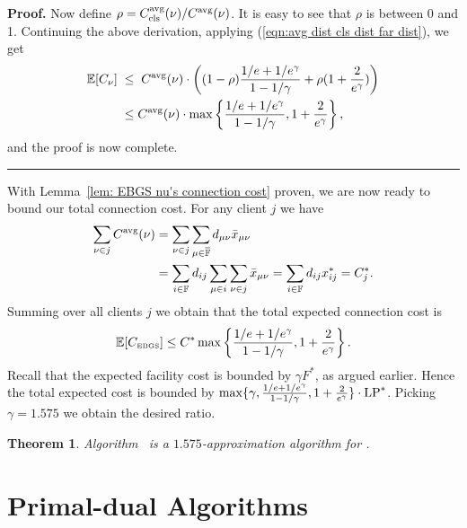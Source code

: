 \documentclass[oneside,final]{ucr}
\newtheorem{theorem}{Theorem}
\newenvironment{proof}[1][Proof]{\textbf{#1.} }{\ \rule{0.5em}{0.5em}}
\begin{document}
\begin{proof}
Now define $\rho =C_{{\mbox{\scriptsize\rm cls}}}^{{\mbox{\scriptsize\rm avg}}}(\nu)/C^{{\mbox{\scriptsize\rm avg}}}(\nu)$. It is easy to
see that $\rho$ is between 0 and 1. Continuing the above
derivation, applying (\ref{eqn:avg dist cls dist far dist}), we get
%
\begin{align*}
\mathbb{E}[C_{\nu}]
             \;&\le\; C^{{\mbox{\scriptsize\rm avg}}}(\nu) 
			\cdot\left((1-\rho)\frac{1/e+1/e^\gamma}{1-1/\gamma} 
				+ \rho (1 + \frac{2}{e^\gamma})\right)
			\\
             &\leq C^{{\mbox{\scriptsize\rm avg}}}(\nu) 
				\cdot \max\left\{\frac{1/e+1/e^\gamma}{1-1/\gamma}, 1 + \frac{2}{e^\gamma}\right\},
\end{align*}
%
and the proof is now complete.
\end{proof}

With Lemma~\ref{lem: EBGS nu's connection cost} proven, we are now ready to bound our total connection cost.
For any client $j$ we have
%
\begin{align*}
\sum_{\nu\in j} C^{{\mbox{\scriptsize\rm avg}}}(\nu)
	&= \sum_{\nu\in j}\sum_{\mu\in\overline{\mathbb{F}}} d_{\mu\nu}{\bar x}_{\mu\nu} 
	\\
	&= \sum_{i\in\mathbb{F}}d_{ij}\sum_{\mu\in i}\sum_{\nu\in j} {\bar x}_{\mu\nu}
	= \sum_{i\in\mathbb{F}} d_{ij}x_{ij}^\ast = C_j^\ast.
\end{align*}
% 
Summing over all clients $j$ we obtain that the total expected connection cost is
%
\begin{equation*}
	\mathbb{E}[ C_{\mbox{\tiny\rm EBGS}} ] \le  C^\ast\max\left\{\frac{1/e+1/e^\gamma}{1-1/\gamma}, 1+\frac{2}{e^\gamma}\right\}.
\end{equation*}
%
Recall that the expected facility cost is bounded by $\gamma F^\ast$,
as argued earlier. Hence the total expected cost is bounded by $\max\{\gamma,
\frac{1/e+1/e^\gamma}{1-1/\gamma}, 1+\frac{2}{e^\gamma}\}\cdot
\mbox{\rm LP}^\ast$. Picking $\gamma=1.575$ we obtain the desired ratio.


\begin{theorem}\label{thm:ebgs}
  Algorithm~{\EBGS} is a $1.575$-approximation algorithm for \FTFP.
\end{theorem}

\chapter{Primal-dual Algorithms} 
\label{ch: primal-dual} 
\end{document}
